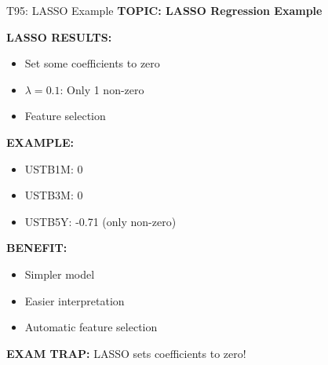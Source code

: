 \documentclass[8pt]{beamer}
\begin{document}
	\begin{frame}{T95: LASSO Example}
		\fontsize{6.5}{7.5}\selectfont
		\textbf{TOPIC: LASSO Regression Example}
		
		\vspace{0.1cm}
		\textbf{LASSO RESULTS:}
		\begin{itemize}
			\item Set some coefficients to zero
			\item $\lambda = 0.1$: Only 1 non-zero
			\item Feature selection
		\end{itemize}
		
		\vspace{0.1cm}
		\textbf{EXAMPLE:}
		\begin{itemize}
			\item USTB1M: 0
			\item USTB3M: 0
			\item USTB5Y: -0.71 (only non-zero)
		\end{itemize}
		
		\vspace{0.1cm}
		\textbf{BENEFIT:}
		\begin{itemize}
			\item Simpler model
			\item Easier interpretation
			\item Automatic feature selection
		\end{itemize}
		
		\textcolor{myred}{\textbf{EXAM TRAP:}} LASSO \textcolor{myblue}{sets coefficients to zero}!
	\end{frame}
	
	
\end{document}

